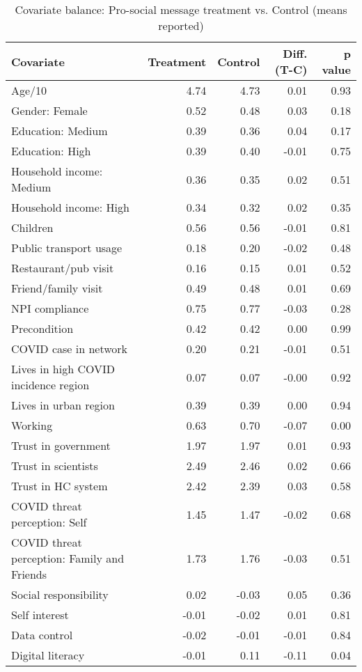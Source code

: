 \begin{table}[h!]
\centering
\caption{Covariate balance: Pro-social message treatment vs. Control (means reported)} 
\label{tab:prosoc-balance}
\begingroup\footnotesize
\begin{tabular}{lrrrr}
  \hline
Covariate & Treatment & Control & Diff. (T-C) & p value \\ 
  \hline
Age/10 & 4.74 & 4.73 & 0.01 & 0.93 \\ 
  Gender: Female & 0.52 & 0.48 & 0.03 & 0.18 \\ 
  Education: Medium & 0.39 & 0.36 & 0.04 & 0.17 \\ 
  Education: High & 0.39 & 0.40 & -0.01 & 0.75 \\ 
  Household income: Medium & 0.36 & 0.35 & 0.02 & 0.51 \\ 
  Household income: High & 0.34 & 0.32 & 0.02 & 0.35 \\ 
  Children & 0.56 & 0.56 & -0.01 & 0.81 \\ 
  Public transport usage & 0.18 & 0.20 & -0.02 & 0.48 \\ 
  Restaurant/pub visit & 0.16 & 0.15 & 0.01 & 0.52 \\ 
  Friend/family visit & 0.49 & 0.48 & 0.01 & 0.69 \\ 
  NPI compliance & 0.75 & 0.77 & -0.03 & 0.28 \\ 
  Precondition & 0.42 & 0.42 & 0.00 & 0.99 \\ 
  COVID case in network & 0.20 & 0.21 & -0.01 & 0.51 \\ 
  Lives in high COVID incidence region & 0.07 & 0.07 & -0.00 & 0.92 \\ 
  Lives in urban region & 0.39 & 0.39 & 0.00 & 0.94 \\ 
  Working & 0.63 & 0.70 & -0.07 & 0.00 \\ 
  Trust in government & 1.97 & 1.97 & 0.01 & 0.93 \\ 
  Trust in scientists & 2.49 & 2.46 & 0.02 & 0.66 \\ 
  Trust in HC system & 2.42 & 2.39 & 0.03 & 0.58 \\ 
  COVID threat perception: Self & 1.45 & 1.47 & -0.02 & 0.68 \\ 
  COVID threat perception: Family and Friends & 1.73 & 1.76 & -0.03 & 0.51 \\ 
  Social responsibility & 0.02 & -0.03 & 0.05 & 0.36 \\ 
  Self interest & -0.01 & -0.02 & 0.01 & 0.81 \\ 
  Data control & -0.02 & -0.01 & -0.01 & 0.84 \\ 
  Digital literacy & -0.01 & 0.11 & -0.11 & 0.04 \\ 
   \hline
\end{tabular}
\endgroup
\end{table}
